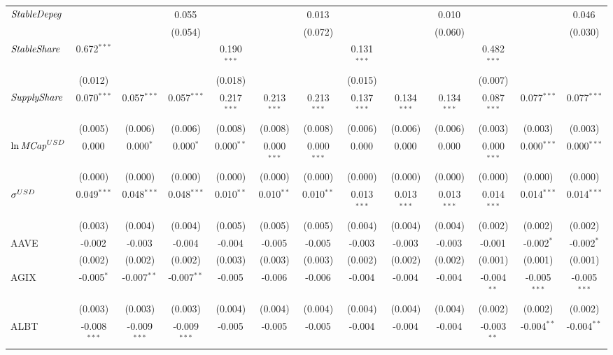 \begin{table}[!htbp]
\begin{tabular}{@{\extracolsep{5pt}}lcccccccccccc}
 ${\it StableDepeg}$ & & & 0.055$^{}$ & & & 0.013$^{}$ & & & 0.010$^{}$ & & & 0.046$^{}$ \\
  & & & (0.054) & & & (0.072) & & & (0.060) & & & (0.030) \\
 ${\it StableShare}$ & 0.672$^{***}$ & & & 0.190$^{***}$ & & & 0.131$^{***}$ & & & 0.482$^{***}$ & & \\
  & (0.012) & & & (0.018) & & & (0.015) & & & (0.007) & & \\
 ${\it SupplyShare}$ & 0.070$^{***}$ & 0.057$^{***}$ & 0.057$^{***}$ & 0.217$^{***}$ & 0.213$^{***}$ & 0.213$^{***}$ & 0.137$^{***}$ & 0.134$^{***}$ & 0.134$^{***}$ & 0.087$^{***}$ & 0.077$^{***}$ & 0.077$^{***}$ \\
  & (0.005) & (0.006) & (0.006) & (0.008) & (0.008) & (0.008) & (0.006) & (0.006) & (0.006) & (0.003) & (0.003) & (0.003) \\
 ${\it \ln MCap}^{USD}$ & 0.000$^{}$ & 0.000$^{*}$ & 0.000$^{*}$ & 0.000$^{**}$ & 0.000$^{***}$ & 0.000$^{***}$ & 0.000$^{}$ & 0.000$^{}$ & 0.000$^{}$ & 0.000$^{***}$ & 0.000$^{***}$ & 0.000$^{***}$ \\
  & (0.000) & (0.000) & (0.000) & (0.000) & (0.000) & (0.000) & (0.000) & (0.000) & (0.000) & (0.000) & (0.000) & (0.000) \\
 ${\it \sigma}^{USD}$ & 0.049$^{***}$ & 0.048$^{***}$ & 0.048$^{***}$ & 0.010$^{**}$ & 0.010$^{**}$ & 0.010$^{**}$ & 0.013$^{***}$ & 0.013$^{***}$ & 0.013$^{***}$ & 0.014$^{***}$ & 0.014$^{***}$ & 0.014$^{***}$ \\
  & (0.003) & (0.004) & (0.004) & (0.005) & (0.005) & (0.005) & (0.004) & (0.004) & (0.004) & (0.002) & (0.002) & (0.002) \\
 AAVE & -0.002$^{}$ & -0.003$^{}$ & -0.004$^{}$ & -0.004$^{}$ & -0.005$^{}$ & -0.005$^{}$ & -0.003$^{}$ & -0.003$^{}$ & -0.003$^{}$ & -0.001$^{}$ & -0.002$^{*}$ & -0.002$^{*}$ \\
  & (0.002) & (0.002) & (0.002) & (0.003) & (0.003) & (0.003) & (0.002) & (0.002) & (0.002) & (0.001) & (0.001) & (0.001) \\
 AGIX & -0.005$^{*}$ & -0.007$^{**}$ & -0.007$^{**}$ & -0.005$^{}$ & -0.006$^{}$ & -0.006$^{}$ & -0.004$^{}$ & -0.004$^{}$ & -0.004$^{}$ & -0.004$^{**}$ & -0.005$^{***}$ & -0.005$^{***}$ \\
  & (0.003) & (0.003) & (0.003) & (0.004) & (0.004) & (0.004) & (0.004) & (0.004) & (0.004) & (0.002) & (0.002) & (0.002) \\
 ALBT & -0.008$^{***}$ & -0.009$^{***}$ & -0.009$^{***}$ & -0.005$^{}$ & -0.005$^{}$ & -0.005$^{}$ & -0.004$^{}$ & -0.004$^{}$ & -0.004$^{}$ & -0.003$^{**}$ & -0.004$^{**}$ & -0.004$^{**}$ \\

\end{tabular}
\end{table}

